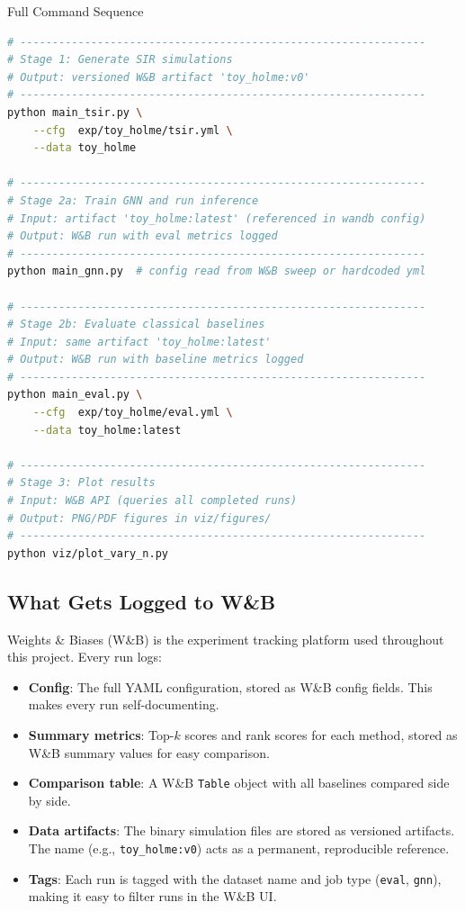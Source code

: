 \begin{codewalk}{Full Command Sequence}
\begin{lstlisting}[language=bash]
# ---------------------------------------------------------------
# Stage 1: Generate SIR simulations
# Output: versioned W&B artifact 'toy_holme:v0'
# ---------------------------------------------------------------
python main_tsir.py \
    --cfg  exp/toy_holme/tsir.yml \
    --data toy_holme

# ---------------------------------------------------------------
# Stage 2a: Train GNN and run inference
# Input: artifact 'toy_holme:latest' (referenced in wandb config)
# Output: W&B run with eval metrics logged
# ---------------------------------------------------------------
python main_gnn.py  # config read from W&B sweep or hardcoded yml

# ---------------------------------------------------------------
# Stage 2b: Evaluate classical baselines
# Input: same artifact 'toy_holme:latest'
# Output: W&B run with baseline metrics logged
# ---------------------------------------------------------------
python main_eval.py \
    --cfg  exp/toy_holme/eval.yml \
    --data toy_holme:latest

# ---------------------------------------------------------------
# Stage 3: Plot results
# Input: W&B API (queries all completed runs)
# Output: PNG/PDF figures in viz/figures/
# ---------------------------------------------------------------
python viz/plot_vary_n.py
\end{lstlisting}
\end{codewalk}

\subsection{What Gets Logged to W\&B}

Weights \& Biases (W\&B) is the experiment tracking platform used throughout this project. Every run logs:

\begin{itemize}
    \item \textbf{Config}: The full YAML configuration, stored as W\&B config fields. This makes every run self-documenting.
    \item \textbf{Summary metrics}: Top-$k$ scores and rank scores for each method, stored as W\&B summary values for easy comparison.
    \item \textbf{Comparison table}: A W\&B \texttt{Table} object with all baselines compared side by side.
    \item \textbf{Data artifacts}: The binary simulation files are stored as versioned artifacts. The name (e.g., \texttt{toy\_holme:v0}) acts as a permanent, reproducible reference.
    \item \textbf{Tags}: Each run is tagged with the dataset name and job type (\texttt{eval}, \texttt{gnn}), making it easy to filter runs in the W\&B UI.
\end{itemize}


